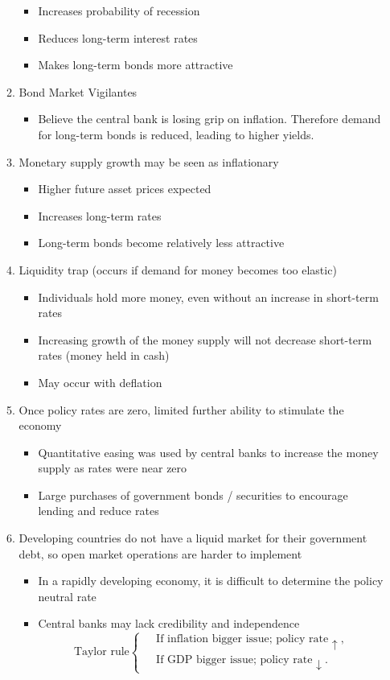 \documentclass[../notes_compiled.tex]{subfiles}
\begin{document}
\begin{itemize}
\begin{enumerate}
\begin{itemize}
\item Increases probability of recession
\item Reduces long-term interest rates
\item Makes long-term bonds more attractive
\end{itemize}
\item Bond Market Vigilantes
\begin{itemize}
\item Believe the central bank is losing grip on inflation. Therefore demand for long-term bonds is reduced, leading to higher yields.
\end{itemize}
\item Monetary supply growth may be seen as inflationary
\begin{itemize}
\item Higher future asset prices expected
\item Increases long-term rates
\item Long-term bonds become relatively less attractive
\end{itemize}
\item Liquidity trap (occurs if demand for money becomes too elastic)
\begin{itemize}
\item Individuals hold more money, even without an increase in short-term rates
\item Increasing growth of the money supply will not decrease short-term rates (money held in cash)
\item May occur with deflation
\end{itemize}
\item Once policy rates are zero, limited further ability to stimulate the economy
\begin{itemize}
\item Quantitative easing was used by central banks to increase the money supply as rates were near zero
\item Large purchases of government bonds / securities to encourage lending and reduce rates
\end{itemize}
\item Developing countries do not have a liquid market for their government debt, so open market operations are harder to implement
\begin{itemize}
\item In a rapidly developing economy, it is difficult to determine the policy neutral rate
\item Central banks may lack credibility and independence
\begin{equation*}
\text{Taylor rule}\begin{cases} &\text{If inflation bigger issue; policy rate $\uparrow$}, \\ & \text{If GDP bigger issue; policy rate $\downarrow$}. \end{cases}
\end{equation*}
\end{itemize}
\end{enumerate}
\end{itemize}
\end{document}
